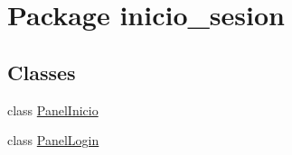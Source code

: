 \hypertarget{namespaceinicio__sesion}{}\section{Package inicio\+\_\+sesion}
\label{namespaceinicio__sesion}
\subsection*{Classes}
\begin{DoxyCompactItemize}
\item 
class \mbox{\hyperlink{classinicio__sesion_1_1_panel_inicio}{Panel\+Inicio}}
\item 
class \mbox{\hyperlink{classinicio__sesion_1_1_panel_login}{Panel\+Login}}
\end{DoxyCompactItemize}
